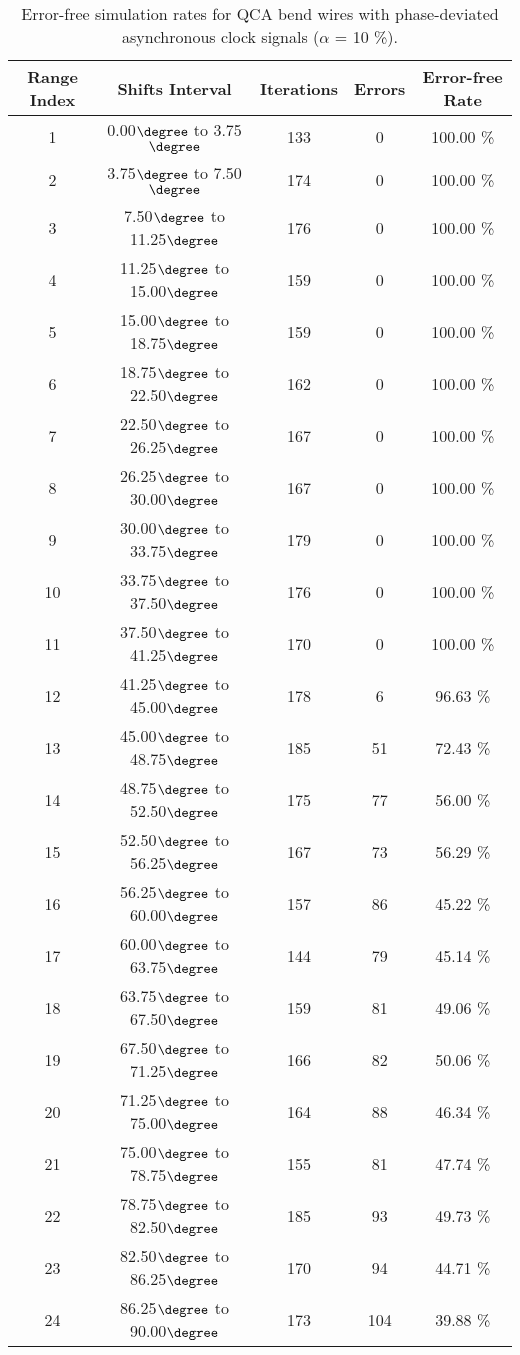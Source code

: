 \flushleft
\begin{table}[h]
\begin{center}
\caption{Error-free simulation rates for QCA bend wires with phase-deviated asynchronous clock signals ($\alpha$ = 10 \%).}
\begin{tabular}{|c|c|c|c|c|}
\hline
\textbf{Range Index} & \textbf{Shifts Interval} & \textbf{Iterations} & \textbf{Errors} & \textbf{Error-free Rate} \\
\hline
1  &  0.00$\degree$ to  3.75$\degree$ & 133 &  0 & 100.00 \% \\
\hline
2  &  3.75$\degree$ to  7.50$\degree$ & 174 &  0 & 100.00 \% \\
\hline
3  &  7.50$\degree$ to 11.25$\degree$ & 176 &  0 & 100.00 \% \\
\hline
4  & 11.25$\degree$ to 15.00$\degree$ & 159 &  0 & 100.00 \% \\
\hline
5  & 15.00$\degree$ to 18.75$\degree$ & 159 &  0 & 100.00 \% \\
\hline
6  & 18.75$\degree$ to 22.50$\degree$ & 162 &  0 & 100.00 \% \\
\hline
7  & 22.50$\degree$ to 26.25$\degree$ & 167 &  0 & 100.00 \% \\
\hline
8  & 26.25$\degree$ to 30.00$\degree$ & 167 &  0 & 100.00 \% \\
\hline
9  & 30.00$\degree$ to 33.75$\degree$ & 179 &  0 & 100.00 \% \\
\hline
10 & 33.75$\degree$ to 37.50$\degree$ & 176 &  0 & 100.00 \% \\
\hline
11 & 37.50$\degree$ to 41.25$\degree$ & 170 &  0 & 100.00 \% \\
\hline
12 & 41.25$\degree$ to 45.00$\degree$ & 178 &  6 &  96.63 \% \\
\hline
13 & 45.00$\degree$ to 48.75$\degree$ & 185 & 51 &  72.43 \% \\
\hline
14 & 48.75$\degree$ to 52.50$\degree$ & 175 & 77 &  56.00 \% \\
\hline
15 & 52.50$\degree$ to 56.25$\degree$ & 167 & 73 &  56.29 \% \\
\hline
16 & 56.25$\degree$ to 60.00$\degree$ & 157 & 86 &  45.22 \% \\
\hline
17 & 60.00$\degree$ to 63.75$\degree$ & 144 & 79 &  45.14 \% \\
\hline
18 & 63.75$\degree$ to 67.50$\degree$ & 159 & 81 &  49.06 \% \\
\hline
19 & 67.50$\degree$ to 71.25$\degree$ & 166 & 82 &  50.06 \% \\
\hline
20 & 71.25$\degree$ to 75.00$\degree$ & 164 & 88 &  46.34 \% \\
\hline
21 & 75.00$\degree$ to 78.75$\degree$ & 155 & 81 &  47.74 \% \\
\hline
22 & 78.75$\degree$ to 82.50$\degree$ & 185 & 93 &  49.73 \% \\
\hline
23 & 82.50$\degree$ to 86.25$\degree$ & 170 & 94 &  44.71 \% \\
\hline
24 & 86.25$\degree$ to 90.00$\degree$ & 173 & 104 &  39.88 \% \\
\hline


\end{tabular}
\end{center}
\end{table}
